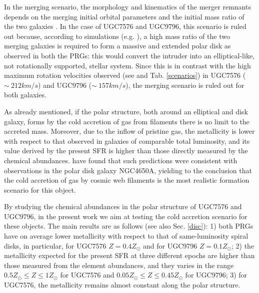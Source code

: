 \documentclass{aa}
\begin{document}

In the merging scenario, the morphology and kinematics of the merger
remnants depends on the merging initial orbital parameters and the
initial mass ratio of the two galaxies \citep{Bou05}. In the case
  of UGC7576 and UGC9796, this scenario is ruled out because,
  according to simulations (e.g. \citealt{Bou05}), a high mass ratio
  of the two merging galaxies is required to form a massive and
  extended polar disk as observed in both the PRGs: this would convert
  the intruder into an elliptical-like, not rotationally supported,
  stellar system. Since this is in contrast with the high
maximum rotation velocities observed (see \citealt{Res94} and
Tab. \ref{scenarios}) in UGC7576 ($\sim\ 212 km/s$) and UGC9796
($\sim\ 157 km/s$), the merging scenario is ruled out for both
galaxies.

As already mentioned, if the polar structure, both around an
elliptical and disk galaxy, forms by the cold accretion of gas from
filaments there is no limit to the accreted mass. Moreover, due to the
inflow of pristine gas, the metallicity is lower with respect to that
observed in galaxies of comparable total luminosity, and its value
derived by the present SFR is higher than those directly measured by
the chemical abundances. \cite{Spav10} have found that such
predictions were consistent with observations in the polar disk
galaxy NGC4650A, yielding to the conclusion that the cold accretion of
gas by cosmic web filaments is the most realistic formation scenario
for this object.

By studying the chemical abundances in the polar structure of
UGC7576 and UGC9796, in the present work we aim at testing the cold
accretion scenario for these objects. The main results are as
follows (see also Sec. \ref{disc}): 1) both PRGs have on average
lower metallicity with respect to that of same-luminosity spiral
disks, in particular, for UGC7576 $Z=0.4 Z_{\odot}$ and for
UGC9796 $Z=0.1 Z_{\odot}$; 2) the metallicity expected for the
present SFR at three different epochs are higher than those
measured from the element abundances, and they varies in the range
$0.5 Z_{\odot} \leq Z \le 1 Z_{\odot}$ for UGC7576 and $0.05
Z_{\odot} \le Z \leq 0.45 Z_{\odot}$ for UGC9796; 3) for UGC7576,
the metallicity remains almost constant along the polar structure.
\end{document}
